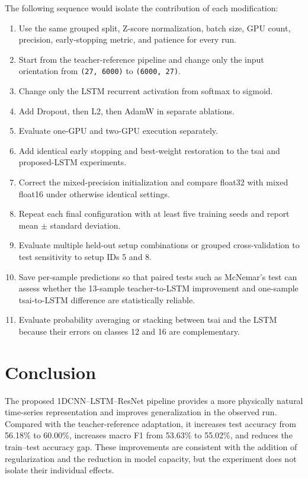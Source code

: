 \documentclass[11pt,a4paper]{article}
\begin{document}
The following sequence would isolate the contribution of each modification:

\begin{enumerate}
    \item Use the same grouped split, Z-score normalization, batch size, GPU
          count, precision, early-stopping metric, and patience for every run.
    \item Start from the teacher-reference pipeline and change only the input
          orientation from \texttt{(27, 6000)} to \texttt{(6000, 27)}.
    \item Change only the LSTM recurrent activation from softmax to sigmoid.
    \item Add Dropout, then L2, then AdamW in separate ablations.
    \item Evaluate one-GPU and two-GPU execution separately.
    \item Add identical early stopping and best-weight restoration to the tsai
          and proposed-LSTM experiments.
    \item Correct the mixed-precision initialization and compare float32 with
          mixed float16 under otherwise identical settings.
    \item Repeat each final configuration with at least five training seeds and
          report mean $\pm$ standard deviation.
    \item Evaluate multiple held-out setup combinations or grouped
          cross-validation to test sensitivity to setup IDs 5 and 8.
    \item Save per-sample predictions so that paired tests such as McNemar's
          test can assess whether the 13-sample teacher-to-LSTM improvement and
          one-sample tsai-to-LSTM difference are statistically reliable.
    \item Evaluate probability averaging or stacking between tsai and the LSTM
          because their errors on classes 12 and 16 are complementary.
\end{enumerate}

\section{Conclusion}

The proposed 1DCNN--LSTM--ResNet pipeline provides a more physically natural
time-series representation and improves generalization in the observed run.
Compared with the teacher-reference adaptation, it increases test accuracy
from 56.18\% to 60.00\%, increases macro F1 from 53.63\% to 55.02\%, and
reduces the train--test accuracy gap. These improvements are consistent with
the addition of regularization and the reduction in model capacity, but the
experiment does not isolate their individual effects.
\end{document}

